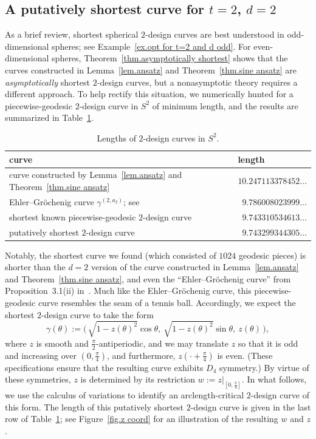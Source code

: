 \documentclass[12pt]{article}
\theoremstyle{plain}
\theoremstyle{definition}
\theoremstyle{remark}
\begin{document}
\subsection{A putatively shortest curve for $t=2$, $d=2$}
\label{subsec.putatively shortest}

As a brief review, shortest spherical $2$-design curves are best understood in odd-dimensional spheres; see Example~\ref{ex.opt for t=2 and d odd}.
For even-dimensional spheres, Theorem~\ref{thm.asymptotically shortest} shows that the curves constructed in Lemma~\ref{lem.ansatz} and Theorem~\ref{thm.sine ansatz} are \textit{asymptotically} shortest $2$-design curves, but a nonasymptotic theory requires a different approach.
To help rectify this situation, we numerically hunted for a piecewise-geodesic $2$-design curve in $S^2$ of minimum length, and the results are summarized in Table~\ref{tab:S2-2-design-lengths}.

\begin{table}[h]
\centering
\begin{tabular}{ll}
\hline
curve & length \\
\hline
curve constructed by Lemma~\ref{lem.ansatz} and Theorem~\ref{thm.sine ansatz} 
    & $10.247113378452\ldots$ \\
Ehler--Gr\"ochenig curve $\gamma^{(2,a_2)}$; see~\cite{EhlerG:23}
    & $\phantom{1}9.786008023999\ldots$ \\
shortest known piecewise-geodesic $2$-design curve
    & $\phantom{1}9.743310534613\ldots$ \\
putatively shortest $2$-design curve
    & $\phantom{1}9.743299344305\ldots$ \\
\hline
\end{tabular}
\caption{Lengths of $2$-design curves in $S^2$.}
\label{tab:S2-2-design-lengths}
\end{table}

Notably, the shortest curve we found (which consisted of $1024$ geodesic pieces) is shorter than the $d=2$ version of the curve constructed in Lemma~\ref{lem.ansatz} and Theorem~\ref{thm.sine ansatz}, and even the ``Ehler--Gr\"ochenig curve'' from Proposition~3.1(ii) in~\cite{EhlerG:23}.
Much like the Ehler--Gr\"ochenig curve, this piecewise-geodesic curve resembles the seam of a tennis ball.
Accordingly, we expect the shortest $2$-design curve to take the form
\[
\gamma(\theta)
:=\Big(\,\sqrt{1-z(\theta)^2}\cos\theta,~\sqrt{1-z(\theta)^2}\sin\theta,~z(\theta)\,\Big),
\]
where $z$ is smooth and $\frac{\pi}{2}$-antiperiodic, and we may translate $z$ so that it is odd and increasing over $(0,\frac{\pi}{4})$, and furthermore, $z(\cdot+\frac{\pi}{4})$ is even.
(These specifications ensure that the resulting curve exhibits $D_4$ symmetry.)
By virtue of these symmetries, $z$ is determined by its restriction $w:=z|_{[0,\frac{\pi}{4}]}$.
In what follows, we use the calculus of variations to identify an arclength-critical $2$-design curve of this form.
The length of this putatively shortest $2$-design curve is given in the last row of Table~\ref{tab:S2-2-design-lengths}; see Figure~\ref{fig.z coord} for an illustration of the resulting $w$ and $z$.
\end{document}
